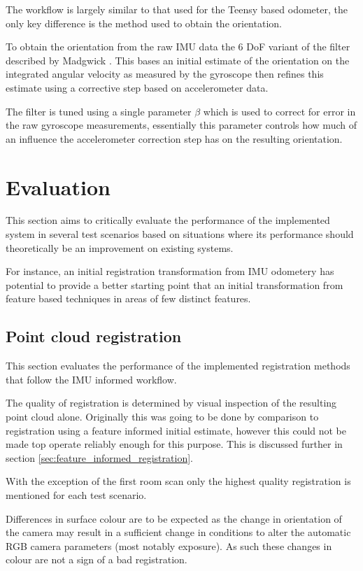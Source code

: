\documentclass{entcs}
\begin{document}
The workflow is largely similar to that used for the Teensy based odometer, the
only key difference is the method used to obtain the orientation.

To obtain the orientation from the raw IMU data the 6 DoF variant of the filter
described by Madgwick \cite{Madgwick2011}. This bases an initial estimate of the
orientation on the integrated angular velocity as measured by the gyroscope then
refines this estimate using a corrective step based on accelerometer data.

The filter is tuned using a single parameter $\beta$ which is used to correct
for error in the raw gyroscope measurements, essentially this parameter controls
how much of an influence the accelerometer correction step has on the resulting
orientation.

\section{Evaluation}

This section aims to critically evaluate the performance of the implemented
system in several test scenarios based on situations where its performance
should theoretically be an improvement on existing systems.

For instance, an initial registration transformation from IMU odometery has
potential to provide a better starting point that an initial transformation from
feature based techniques in areas of few distinct features.

\subsection{Point cloud registration}

This section evaluates the performance of the implemented registration methods
that follow the IMU informed workflow.

The quality of registration is determined by visual inspection of the resulting
point cloud alone. Originally this was going to be done by comparison to
registration using a feature informed initial estimate, however this could not
be made top operate reliably enough for this purpose. This is discussed further
in section \ref{sec:feature_informed_registration}.

With the exception of the first room scan only the highest quality registration
is mentioned for each test scenario.

Differences in surface colour are to be expected as the change in orientation of
the camera may result in a sufficient change in conditions to alter the
automatic RGB camera parameters (most notably exposure). As such these changes
in colour are not a sign of a bad registration.
\end{document}
